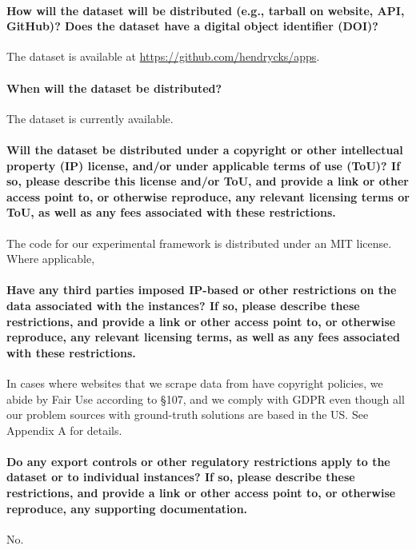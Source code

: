 \paragraph{How will the dataset will be distributed (e.g., tarball on website,
API, GitHub)? Does the dataset have a digital object identifier (DOI)?}
The dataset is available at \href{https://github.com/hendrycks/apps}{https://github.com/hendrycks/apps}.

\paragraph{When will the dataset be distributed?}
The dataset is currently available.

\paragraph{Will the dataset be distributed under a copyright or other intellectual property (IP) license, and/or under applicable terms of use
(ToU)? If so, please describe this license and/or ToU, and provide a link
or other access point to, or otherwise reproduce, any relevant licensing
terms or ToU, as well as any fees associated with these restrictions.}
The code for our experimental framework is distributed under an MIT license. Where applicable, 

\paragraph{Have any third parties imposed IP-based or other restrictions on
the data associated with the instances? If so, please describe these
restrictions, and provide a link or other access point to, or otherwise
reproduce, any relevant licensing terms, as well as any fees associated
with these restrictions.}
In cases where websites that we scrape data from have copyright policies, we abide by Fair Use according to §107, and we comply with GDPR even though all our problem sources with ground-truth solutions are based in the US. See Appendix A for details.

\paragraph{Do any export controls or other regulatory restrictions apply to
the dataset or to individual instances? If so, please describe these
restrictions, and provide a link or other access point to, or otherwise
reproduce, any supporting documentation.}
No.

